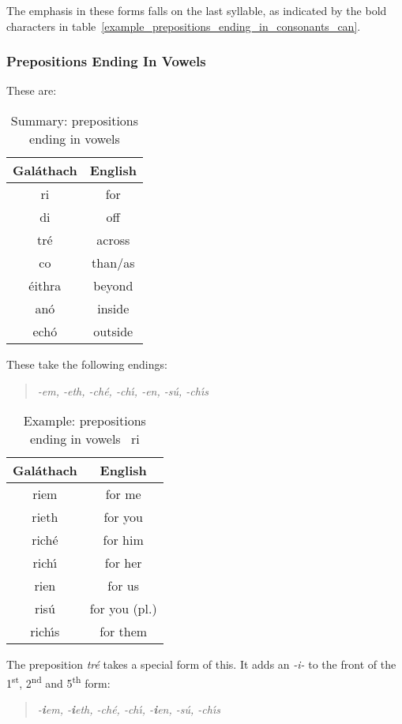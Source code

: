 The emphasis in these forms falls on the last syllable, as indicated by the bold characters in table~\ref{example_prepositions_ending_in_consonants_can}.

\subsubsection{Prepositions Ending In Vowels}

These are:
\begin{table}[H]
\centering
\begin{tabu}{c|c}
  \textbf{Gal\'{a}thach} & \textbf{English}\\
  \toprule
  ri & for\\
  di & off\\
  tr\'{e} & across\\
  co & than/as\\
  \'{e}ithra & beyond\\
  an\'{o} & inside\\
  ech\'{o} & outside
\end{tabu}
\caption{Summary: prepositions ending in vowels}
\label{summary_prepositions_ending_in_vowels}
\end{table}

These take the following endings:
\begin{quote}
\textit{-em, -eth, -ch\'{e}, -ch\'{\i}, -en, -s\'{u}, -ch\'{\i}s}
\end{quote}

\begin{table}[H]
\centering
\begin{tabu}{c|c}
  \textbf{Gal\'{a}thach} & \textbf{English}\\
  \toprule
  riem & for me\\
  rieth & for you\\
  rich\'{e} & for him\\
  rich\'{\i} & for her\\
  rien & for us\\
  ris\'{u} & for you (pl.)\\
  rich\'{\i}s & for them
\end{tabu}
\caption{Example: prepositions ending in vowels \textendash\ ri}
\label{example_prepositions_ending_in_vowels_ri}
\end{table}

The preposition \textit{tr\'{e}} takes a special form of this. It adds an \textit{-i-} to the front of the 1\textsuperscript{st}, 2\textsuperscript{nd} and 5\textsuperscript{th} form:
\begin{quote}
\textit{-\textbf{i}em, -\textbf{i}eth, -ch\'{e}, -ch\'{\i}, -\textbf{i}en, -s\'{u}, -ch\'{\i}s}
\end{quote}

